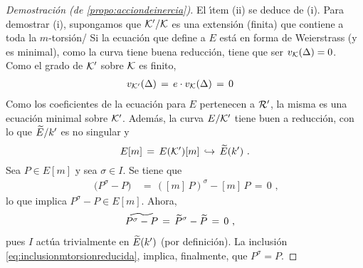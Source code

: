 \begin{proof}[Demostraci\'{o}n (de \ref{propo:acciondeinercia})]
	El \'{\i}tem (ii) se deduce de (i). Para demostrar (i), supongamos que
	$\cal{K}'/\cal{K}$ es una extensi\'{o}n (finita) que contiene a toda la
	$m$-torsi\'{o}n/ Si la ecuaci\'{o}n que define a $E$ est\'{a} en forma
	de Weierstrass (y es minimal), como la curva tiene buena reducci\'{o}n,
	tiene que ser $v_{\cal{K}}(\Delta)=0$. Como el grado de $\cal{K}'$
	sobre $\cal{K}$ es finito,
	\begin{align*}
		v_{\cal{K}'}(\Delta) & \,=\,e\cdot v_{\cal{K}}(\Delta)\,=\,0
	\end{align*}
	Como los coeficientes de la ecuaci\'{o}n para $E$ pertenecen a
	$\cal{R}'$, la misma es una ecuaci\'{o}n minimal sobre $\cal{K}'$.
	Adem\'{a}s, la curva $E/\cal{K}'$ tiene buen a reducci\'{o}n, con lo
	que $\reducido{E}/k'$ es no singular y
	\begin{equation}
		\label{eq:inclusionmtorsionreducida}
		E[m] \,=\,E(\cal{K}')[m]\,\hookrightarrow\,
			\reducido{E}(k')
		\text{ .}
	\end{equation}
	Sea $P\in E[m]$ y sea $\sigma\in I$. Se tiene que
	\begin{align*}
		[m]\,\big(P^{\sigma}-P\big) & \,=\,([m]\,P)^{\sigma}-[m]\,P
			\,=\,0
		\text{ ,}
	\end{align*}
	lo que implica $P^{\sigma}-P\in E[m]$. Ahora,
	\begin{align*}
		\reducido{P^{\sigma}-P} & \,=\,
			\reducido{P}^{\sigma}-\reducido{P} \,=\,0
		\text{ ,}
	\end{align*}
	pues $I$ act\'{u}a trivialmente en $\reducido{E}(k')$ (por
	definici\'{o}n). La inclusi\'{o}n \eqref{eq:inclusionmtorsionreducida},
	implica, finalmente, que $P^{\sigma}=P$.
\end{proof}

